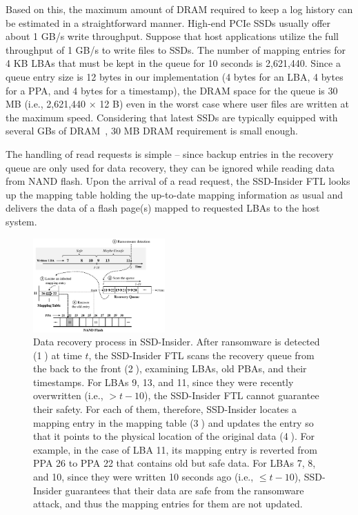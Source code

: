 \documentclass[conference]{IEEEtran}
\newcommand{\ours}{SSD-Insider}
\begin{document}
Based on this, the maximum amount of DRAM required to keep a log
history can be estimated in a straightforward manner.  High-end
PCIe SSDs usually offer about 1 GB/s write throughput.  Suppose
that host applications utilize the full throughput of 1 GB/s to
write files to SSDs.  The number of mapping entries for 4 KB LBAs
that must be kept in the queue for 10 seconds is 2,621,440.  Since
a queue entry size is 12 bytes in our implementation (4 bytes for
an LBA, 4 bytes for a PPA, and 4 bytes for a timestamp), the DRAM
space for the queue is 30 MB (i.e., 2,621,440 $\times$ 12 B) even
in the worst case where user files are written at the maximum
speed.  Considering that latest SSDs are typically equipped with
several GBs of DRAM~\cite{hitachi-ssd, samsung-ssd, phison-ssd}, 30
MB DRAM requirement is small enough.

The handling of read requests is simple -- since backup entries in
the recovery queue are only used for data recovery, they can be
ignored while reading data from NAND flash. Upon the arrival of a
read request, the \ours{} FTL looks up the mapping table
holding the up-to-date mapping information as usual and delivers
the data of a flash page(s) mapped to requested LBAs to the host
system.

\begin{figure}
\centering
\includegraphics[width=0.45\textwidth]{fig/flash-fig3}
\caption{
Data recovery process in \ours{}.  After ransomware is detected
(\textcircled{1}) at time $t$, the \ours{} FTL scans the
recovery queue from the back to the front (\textcircled{2}),
examining LBAs, old PBAs, and their timestamps.  For LBAs 9, 13,
and 11, since they were recently overwritten (i.e., $> t-10$), the
\ours{} FTL cannot guarantee their safety.  For each of them,
therefore, \ours{} locates a mapping entry in the mapping table
(\textcircled{3}) and updates the entry so that it points to the
physical location of the original data (\textcircled{4}). For
example, in the case of LBA 11, its mapping entry is reverted from
PPA 26 to PPA 22 that contains old but safe data.  For LBAs 7, 8,
and 10, since they were written 10 seconds ago (i.e., $\leq t-10$),
\ours{} guarantees that their data are safe from the ransomware
attack, and thus the mapping entries for them are not updated.  
}
\label{fig:recovery}
\end{figure}
\end{document}
